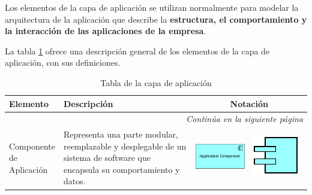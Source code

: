 {    Los elementos de la capa de aplicación se utilizan normalmente para modelar la arquitectura de la aplicación que describe la \textbf{estructura, el comportamiento y la interacción de las aplicaciones de la empresa}.
    
    La tabla \ref{tab:Tabla de la capa de aplicación}  ofrece una descripción general de los elementos de la capa de aplicación, con sus definiciones.\cite{archimate} 
    
    
    \begin{longtable}{|p{0.15\linewidth}|p{0.45\linewidth}|p{0.2\linewidth} p{0.2\linewidth}|}
    	\caption{Tabla de la capa de aplicación}
    	\\
    	\hline
    	\rowcolor[HTML]{AFC5F6} 
    	\textbf{Elemento} & \textbf{Descripción} & \multicolumn{2}{c|}{\textbf{Notación}} \\
    	\hline
    	\endhead
    	\hline
    	\multicolumn{4}{r}{\textit{Continúa en la siguiente página}} \\
    	\endfoot
    	\hline
    	\endlastfoot
    	\label{tab:Tabla de la capa de aplicación}
    	
    	
    	
    	Componente de Aplicación 
    	&
    	Representa una parte modular, reemplazable y desplegable de un sistema de software que encapsula su comportamiento y datos. 
    	&
    	\begin{center}
    		\includegraphics[width=1\linewidth]{imgs/aplication_component.pdf}
    	\end{center} 
    	&
    	\begin{center}
    		\includegraphics[width=0.5\linewidth]{imgs/component.pdf}
    	\end{center}
    	\\ \hline
    	

\end{longtable}}
